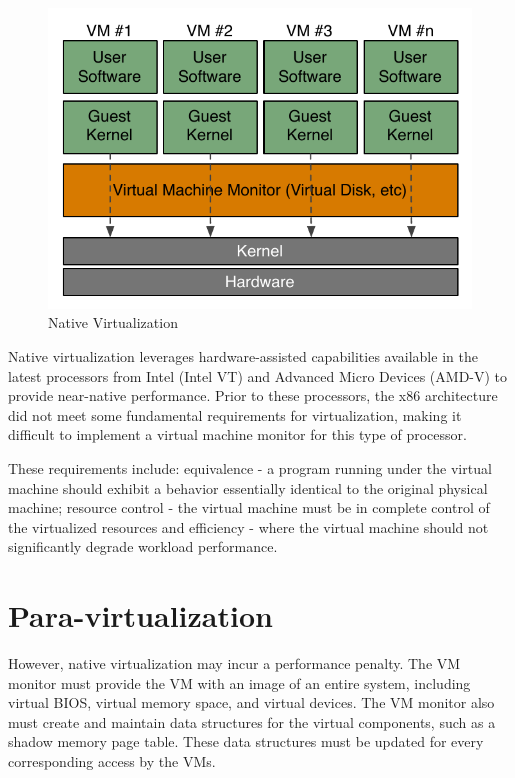 \begin{figure}[H]
	\center
	\includegraphics[scale=0.75]{intro/native-virtualization}
	\caption{Native Virtualization}
\end{figure}

Native virtualization leverages hardware-assisted capabilities available in the
latest processors from Intel (Intel VT) and Advanced Micro Devices (AMD-V) to
provide near-native performance. Prior to these processors, the x86
architecture did not meet some fundamental requirements for virtualization,
making it difficult to implement a virtual machine monitor for this type of
processor.

These requirements include: equivalence - a program running under the virtual
machine should exhibit a behavior essentially identical to the original
physical machine; resource control - the virtual machine must be in complete
control of the virtualized resources and efficiency - where the virtual machine
should not significantly degrade workload performance.~\cite{wp-native-virt}

\section{Para-virtualization}

However, native virtualization may incur a performance penalty.  The VM monitor
must provide the VM with an image of an entire system, including virtual BIOS,
virtual memory space, and virtual devices. The VM monitor also must create and
maintain data structures for the virtual components, such as a shadow memory
page table. These data structures must be updated for every corresponding
access by the VMs.

